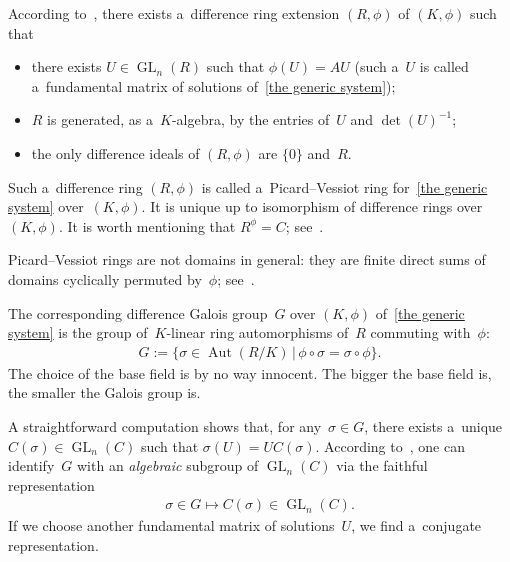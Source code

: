 According to~\cite[Section~1.1]{VdPS97}, there exists a~dif\/ference ring extension $(R,\phi)$ of $(K,\phi)$ such that
\begin{itemize}\itemsep=0pt
\item[1)] there exists $U \in \operatorname{GL}_{n}(R)$ such that $\phi (U) = AU$ (such a~$U$ is called a~fundamental
matrix of solutions of~\eqref{the generic system});
\item[2)] $R$ is generated, as a~$K$-algebra, by the entries of~$U$ and $\det(U)^{-1}$;
\item[3)] the only dif\/ference ideals of $(R,\phi)$ are $\{0\}$ and~$R$.
\end{itemize}
Such a~dif\/ference ring $(R,\phi)$ is called a~Picard--Vessiot ring for~\eqref{the generic system} over~$(K,\phi)$.
It is unique up to isomorphism of dif\/ference rings over $(K,\phi)$.
It is worth mentioning that $R^{\phi}=C$; see~\cite[Lemma~1.8]{VdPS97}.
\begin{Remark}
Picard--Vessiot rings are not domains in general: they are f\/inite direct sums of domains cyclically permuted by~$\phi$;
see~\cite[Corollary~1.16]{VdPS97}.
\end{Remark}

The corresponding dif\/ference Galois group~$G$ over $(K,\phi)$ of~\eqref{the generic system} is the group of~$K$-linear
ring automorphisms of~$R$ commuting with~$\phi$:
\begin{gather*}
G:=\{\sigma \in \operatorname{Aut}(R/K) \, | \, \phi\circ\sigma=\sigma\circ \phi \}.
\end{gather*}
The choice of the base f\/ield is by no way innocent.
The bigger the base f\/ield is, the smaller the Galois group is.

A straightforward computation shows that, for any~$\sigma {\in} G$, there exists a~unique ${C(\sigma) {\in}
\operatorname{GL}_{n}(C)}$ such that $\sigma(U)=UC(\sigma)$.
According to~\cite[Theorem~1.13]{VdPS97}, one can identify~$G$ with an {\it algebraic} subgroup of
$\operatorname{GL}_{n}(C)$ via the faithful representation
\begin{gather*}
\sigma \in G \mapsto C(\sigma) \in \operatorname{GL}_{n}(C).
\end{gather*}
If we choose another fundamental matrix of solutions~$U$, we f\/ind a~conjugate representation.

